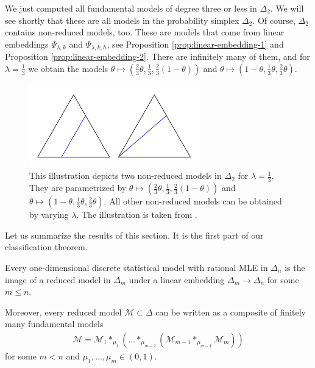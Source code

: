 \begin{example}
We just computed all fundamental models of degree three or less in \( \Delta_2 \). We will see shortly that these are all models in the probability simplex \( \Delta_2 \). Of course, \( \Delta_2 \) contains non-reduced models, too. These are models that come from linear embeddings \( \Psi_{\lambda,k} \) and \( \Psi_{\lambda,k,h} \), see Proposition \ref{prop:linear-embedding-1} and Proposition \ref{prop:linear-embedding-2}. There are infinitely many of them, and for \( \lambda = \frac{1}{3} \) we obtain the models \( \theta \mapsto (\frac{2}{3}\theta, \frac{1}{3}, \frac{2}{3}(1 - \theta)) \) and \( \theta \mapsto (1-\theta, \frac{1}{3}\theta, \frac{2}{3}\theta) \).

\begin{figure}[H]
    \centering
    \includegraphics[width=0.66\textwidth]{assets/non-red-models-delta-2.png}
    \caption{This illustration depicts two non-reduced models in \( \Delta_2 \) for \( \lambda = \frac{1}{3} \). They are parametrized by \( \theta \mapsto (\frac{2}{3}\theta, \frac{1}{3}, \frac{2}{3}(1 - \theta)) \) and \( \theta \mapsto (1-\theta, \frac{1}{3}\theta, \frac{2}{3}\theta) \). All other non-reduced models can be obtained by varying \( \lambda \). The illustration is taken from \cite{bik2022classifying}.} 
\end{figure}
\end{example}

Let us summarize the results of this section. It is the first part of our classification theorem.

\begin{theorem}\label{thm:classification-jekns}
    Every one-dimensional discrete statistical model with rational MLE in \( \Delta_n \) is the image of a reduced model in \( \Delta_m \) under a linear embedding \( \Delta_m \to \Delta_n \) for some \( m \leq n \).

    Moreover, every reduced model \( \mathcal{M} \subset \Delta \) can be written as a composite of finitely many fundamental models
    \begin{align*}
        \mathcal{M} = \mathcal{M}_1 *_{\mu_1} ( \dots *_{\mu_{m-2}}( \mathcal{M}_{m-1} *_{\mu_{m-1}} \mathcal{M}_m) )
    \end{align*}
    for some \( m < n \) and \( \mu_1, \dots, \mu_m \in (0,1) \).
\end{theorem}

